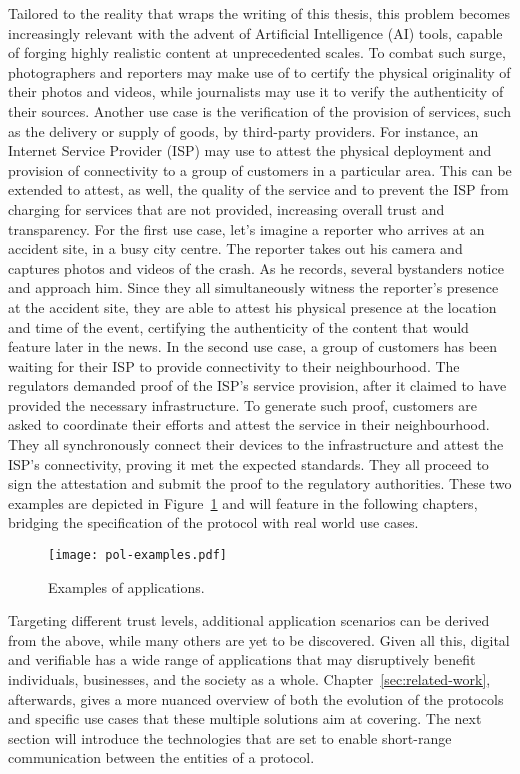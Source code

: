Tailored to the reality that wraps the writing of this thesis, this problem becomes increasingly relevant with the advent of Artificial Intelligence (AI) tools, capable of forging highly realistic content at unprecedented scales. To combat such surge, photographers and reporters may make use of \pol{} to certify the physical originality of their photos and videos, while journalists may use it to verify the authenticity of their sources. Another use case is the verification of the provision of services, such as the delivery or supply of goods, by third-party providers. For instance, an Internet Service Provider (ISP) may use \pol{} to attest the physical deployment and provision of connectivity to a group of customers in a particular area. This can be extended to attest, as well, the quality of the service and to prevent the ISP from charging for services that are not provided, increasing overall trust and transparency. For the first use case, let's imagine a reporter who arrives at an accident site, in a busy city centre. The reporter takes out his camera and captures photos and videos of the crash. As he records, several bystanders notice and approach him. Since they all simultaneously witness the reporter's presence at the accident site, they are able to attest his physical presence at the location and time of the event, certifying the authenticity of the content that would feature later in the news. In the second use case, a group of customers has been waiting for their ISP to provide connectivity to their neighbourhood. The regulators demanded proof of the ISP's service provision, after it claimed to have provided the necessary infrastructure. To generate such proof, customers are asked to coordinate their efforts and attest the service in their neighbourhood. They all synchronously connect their devices to the infrastructure and attest the ISP's connectivity, proving it met the expected standards. They all proceed to sign the attestation and submit the proof to the regulatory authorities. These two examples are depicted in Figure~\ref{fig:proof-of-location-example-scenarios} and will feature in the following chapters, bridging the specification of the \pol{} protocol with real world use cases.

\begin{figure}[h!]
    \begin{center}
    \texttt{[image: pol-examples.pdf]}
    \caption{Examples of \pol{} applications.}
    \label{fig:proof-of-location-example-scenarios}
    \end{center}
\end{figure}

Targeting different trust levels, additional application scenarios can be derived from the above, while many others are yet to be discovered. Given all this, digital and verifiable \pol{} has a wide range of applications that may disruptively benefit individuals, businesses, and the society as a whole. Chapter~\ref{sec:related-work}, afterwards, gives a more nuanced overview of both the evolution of the protocols and specific use cases that these multiple solutions aim at covering. The next section will introduce the technologies that are set to enable short-range communication between the entities of a \pol{} protocol.
